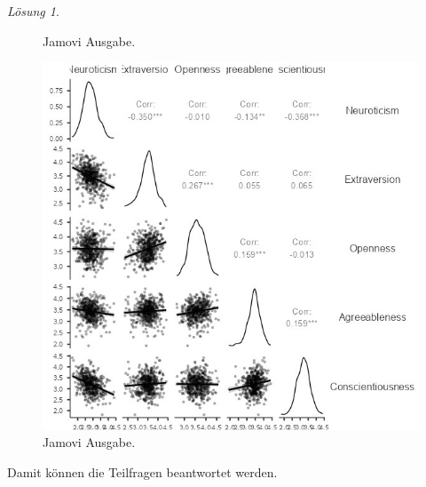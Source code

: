 \documentclass[
]{book}
\theoremstyle{definition}
\theoremstyle{definition}
\theoremstyle{definition}
\theoremstyle{definition}
\theoremstyle{remark}
\newtheorem*{solution}{Lösung}
\begin{document}
\begin{solution}
\begin{figure}
{}

\caption{Jamovi Ausgabe.}\label{fig:sol-big-five-cor-output-koorelationsmatrix}
\end{figure}

\begin{figure}

{\centering \includegraphics[width=1\linewidth]{figures/08-exr-big-five-cor-jmv-output-korrelationsmatrixdiagramm} 

}

\caption{Jamovi Ausgabe.}\label{fig:sol-big-five-cor-output-koorelationsmatrixdiagramm}
\end{figure}

Damit können die Teilfragen beantwortet werden.


\end{solution}
\end{document}
